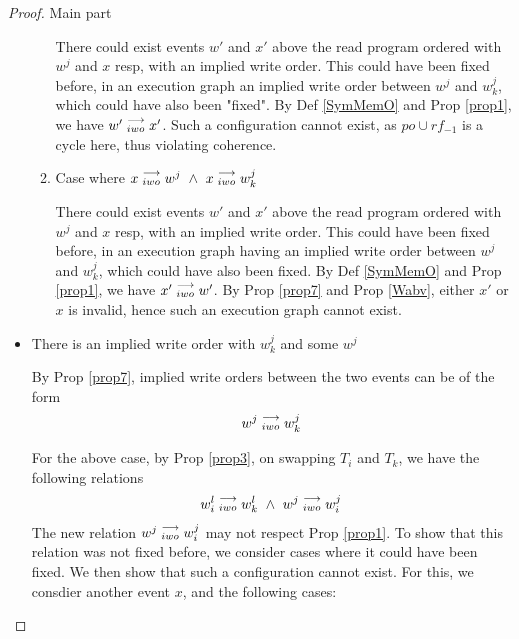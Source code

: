 \begin{proof}{Main part}
\begin{itemize}
\begin{enumerate}
                                There could exist events $w'$ and $x'$ above the read program ordered with $w^j$ and $x$ resp, with an implied write order. This could have been fixed before, in an execution graph an implied write order between $w^j$ and $w_k^j$, which could have also been "fixed". 
                                By Def \ref{SymMemO} and Prop \ref{prop1}, we have $w'\stackrel{\longrightarrow}{_{iwo}}x'$. 
                                Such a configuration cannot exist, as $po \cup rf_{-1}$ is a cycle here, thus violating coherence.
                                
                            \item Case where $x\stackrel{\longrightarrow}{_{iwo}}w^j \ \wedge \ x\stackrel{\longrightarrow}{_{iwo}}w_k^j$
                                
                                There could exist events $w'$ and $x'$ above the read program ordered with $w^j$ and $x$ resp, with an implied write order. 
                                This could have been fixed before, in an execution graph having an implied write order between $w^j$ and $w_k^j$, which could have also been fixed.
                                By Def \ref{SymMemO} and Prop \ref{prop1}, we have $x'\stackrel{\longrightarrow}{_{iwo}}w'$. 
                                By Prop \ref{prop7} and Prop \ref{Wabv}, either $x'$ or $x$ is invalid, hence such an execution graph cannot exist. 

                        \end{enumerate}


                    \item There is an implied write order with $w_k^j$ and some $w^j$
                    
                        By Prop \ref{prop7}, implied write orders between the two events can be of the form 
                        \begin{align*}
                            w^j\stackrel{\longrightarrow}{_{iwo}}w_k^j 
                        \end{align*}
                        
                        For the above case, by Prop \ref{prop3}, on swapping $T_i$ and $T_k$, we have the following relations 
                        \begin{align*}
                            \reln{w_i^l}{iwo}{w_k^l} \ \wedge \ \reln{w^j}{iwo}{w_i^j}
                        \end{align*}
                        The new relation $w^j\stackrel{\longrightarrow}{_{iwo}}w_i^j$ may not respect Prop \ref{prop1}. 
                        To show that this relation was not fixed before, we consider cases where it could have been fixed. We then show that such a configuration cannot exist. For this, we consdier another event $x$, and the following cases:
                        \begin{enumerate}
                            

\end{enumerate}
\end{itemize}
\end{proof}
